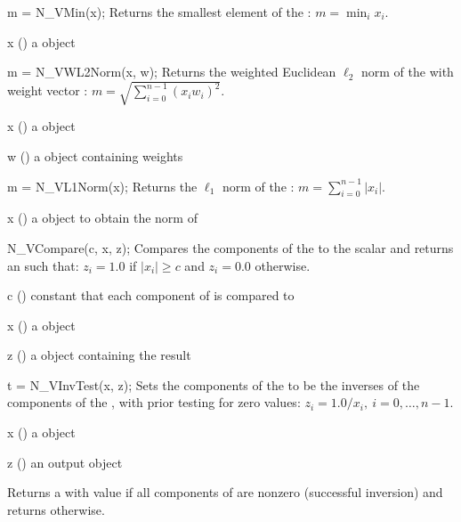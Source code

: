 {
  m = N\_VMin(x);
}
{
  Returns the smallest element of the  :
  $m = \min_i x_i $.
}
{
  \begin{args}[x]
  \item[x] () a {\nvector} object
  \end{args}
}
{
}
{}

{
  m = N\_VWL2Norm(x, w);
}
{
  Returns the weighted Euclidean $\ell_2$ norm of the  
  with  weight vector :
  $m = \sqrt{\sum_{i=0}^{n-1} (x_i w_i)^2}$.
}
{
  \begin{args}[x]
  \item[x] () a {\nvector} object
  \item[w] () a {\nvector} object containing weights
  \end{args}
}
{
}
{}

{
  m = N\_VL1Norm(x);
}
{
  Returns the $\ell_1$ norm of the  :
  $m = \sum_{i=0}^{n-1} | x_i |$.
}
{
  \begin{args}[x]
  \item[x] () a {\nvector} object to obtain the norm of
  \end{args}
}
{
}
{}

{
  N\_VCompare(c, x, z);
}
{
  Compares the components of the   to the 
  scalar  and returns an   such that:
  $z_i = 1.0$ if $| x_i | \ge c$ and $z_i = 0.0$ otherwise.
}
{
  \begin{args}[c]
  \item[c] () constant that each component of  is compared to
  \item[x] () a {\nvector} object
  \item[z] () a {\nvector} object containing the result
  \end{args}
}
{}
{}

{
  t = N\_VInvTest(x, z);
}
{
  Sets the components of the   to be the inverses
  of the components of the  , with prior testing
  for zero values: $z_i = 1.0 /  x_i  , \: i=0,\ldots,n-1$.
}
{
  \begin{args}[x]
  \item[x] () a {\nvector} object
  \item[z] () an output {\nvector} object
  \end{args}
}
{
  Returns a  with value  if all components
  of  are nonzero (successful inversion) and returns
   otherwise.
}
{}

